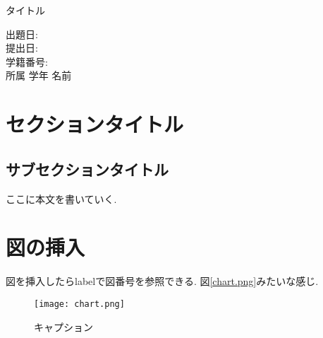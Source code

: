 \documentclass{jarticle}
\begin{document}
\centering
  タイトル

\raggedright
  出題日:\\
  提出日:\\
  学籍番号:\\
  所属 学年 名前

\section{セクションタイトル}

\subsection{サブセクションタイトル}

ここに本文を書いていく.

\section{図の挿入}

図を挿入したらlabelで図番号を参照できる.
図\ref{chart.png}みたいな感じ.

\centering
  \begin{figure}[htbp]
    \texttt{[image: chart.png]}
    \caption{キャプション}
    \label{chart}
  \end{figure}
\end{document}
